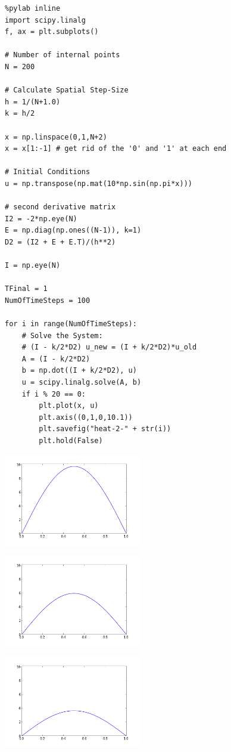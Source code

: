 \documentclass[12pt,fleqn]{article}\usepackage{../common}
\begin{document}
\begin{verbatim}
%pylab inline
import scipy.linalg
f, ax = plt.subplots()

# Number of internal points
N = 200

# Calculate Spatial Step-Size
h = 1/(N+1.0)
k = h/2

x = np.linspace(0,1,N+2)
x = x[1:-1] # get rid of the '0' and '1' at each end

# Initial Conditions
u = np.transpose(np.mat(10*np.sin(np.pi*x)))

# second derivative matrix
I2 = -2*np.eye(N)
E = np.diag(np.ones((N-1)), k=1)
D2 = (I2 + E + E.T)/(h**2)

I = np.eye(N)

TFinal = 1
NumOfTimeSteps = 100

for i in range(NumOfTimeSteps):
    # Solve the System: 
    # (I - k/2*D2) u_new = (I + k/2*D2)*u_old
    A = (I - k/2*D2)
    b = np.dot((I + k/2*D2), u)
    u = scipy.linalg.solve(A, b)
    if i % 20 == 0:
        plt.plot(x, u)
        plt.axis((0,1,0,10.1))
        plt.savefig("heat-2-" + str(i))
        plt.hold(False)
\end{verbatim}

\includegraphics[height=4cm]{heat-2-0.png}

\includegraphics[height=4cm]{heat-2-20.png}

\includegraphics[height=4cm]{heat-2-40.png}
\end{document}
